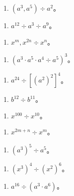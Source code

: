 \begin{enumerate}[start=11]
\item
  \((a^3, a^5) \div a^2\)。
\end{enumerate}

\begin{enumerate}[start=13]
\item
  \(a^{12} \div a^3 \div a^9\)。
\end{enumerate}

\begin{enumerate}[start=15]
\item
  \(x^{m}, x^{2n} \div x^{n}\)。
\end{enumerate}

\begin{enumerate}[start=17]
\item
  \((a^3 \cdot a^5 \cdot a^4 \div a^5)^3\)。
\end{enumerate}

\begin{enumerate}[start=19]
\item
  \(a^{24} \div [(a^2)^2]^4\)。
\end{enumerate}

\begin{enumerate}[start=2]
\item
  \(b^{12} \div b^{11}\)。
\end{enumerate}

\begin{enumerate}[start=4]
\item
  \(x^{100} \div x^{10}\)。
\end{enumerate}

\begin{enumerate}[start=6]
\item
  \(x^{2m + n} \div x^m\)。
\end{enumerate}

\begin{enumerate}[start=8]
\item
  \((a^3)^5 \div a^5\)。
\end{enumerate}

\begin{enumerate}[start=10]
\item
  \((x^{3})^{4} \div (x^{2})^{6}\)。
\end{enumerate}

\begin{enumerate}[start=12]
\item
  \(a^{16} \div (a^3 \cdot a^6)\)。
\end{enumerate}

